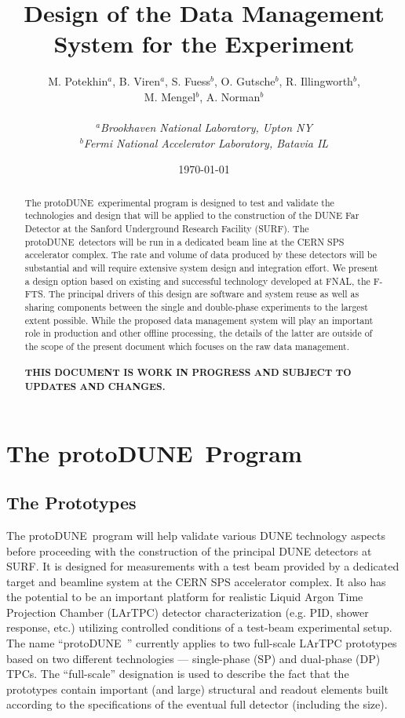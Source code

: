 \documentclass[pdftex,12pt,letter]{article}
\title{Design of the Data Management System for the \pd Experiment}
\date{\today}
\author{M. Potekhin$^a$, B. Viren$^a$, S. Fuess$^b$, O. Gutsche$^b$, R. Illingworth$^b$,\\M. Mengel$^b$,
 A. Norman$^b$\\
\ \\
$^a$\textit{Brookhaven National Laboratory, Upton NY}\\
$^b$\textit{Fermi National Accelerator Laboratory, Batavia IL}}
\newcommand{\pd}{protoDUNE\ }
\begin{document}
\maketitle



\begin{abstract}
\noindent The \pd experimental program is designed to test and validate the technologies and design that will be applied to the construction
of the DUNE Far Detector at the Sanford Underground Research Facility (SURF).  The \pd detectors will be run in a dedicated beam line
at the CERN SPS accelerator complex. The rate and volume of data produced by these detectors will be substantial and will require
extensive system design and integration effort. We present a design option based on existing and successful technology developed at
FNAL, the F-FTS. The principal drivers of this design are software and system reuse as well as sharing components between the single and
double-phase experiments to the largest extent possible. While the proposed data management system will play an important role in
production and other offline processing, the details of the latter are outside of the scope of the present document which focuses on
the raw data management.
\ 
\\
\\
\noindent \textbf{THIS DOCUMENT IS WORK IN PROGRESS AND SUBJECT TO UPDATES AND CHANGES.}
\end{abstract}
\newpage
\tableofcontents
\newpage
\section{The \pd Program}
\label{S:1}
\subsection{The Prototypes}
The \pd program will help validate various DUNE technology aspects before proceeding with the construction of the principal DUNE detectors at SURF.
It is designed for measurements with a test beam provided by a dedicated target and beamline system at the CERN SPS accelerator complex.
It also has the potential to be an important platform for realistic Liquid Argon Time Projection Chamber (LArTPC) detector characterization
(e.g. PID, shower response, etc.) utilizing controlled conditions of a test-beam experimental setup. The name ``\pd'' currently applies to two
full-scale LArTPC prototypes based on two different technologies --- single-phase (SP) and dual-phase (DP) TPCs.
The ``full-scale'' designation is used to describe the fact that the prototypes
contain important (and large) structural and readout elements built according to the specifications
of the eventual full detector (including the size).
\end{document}
